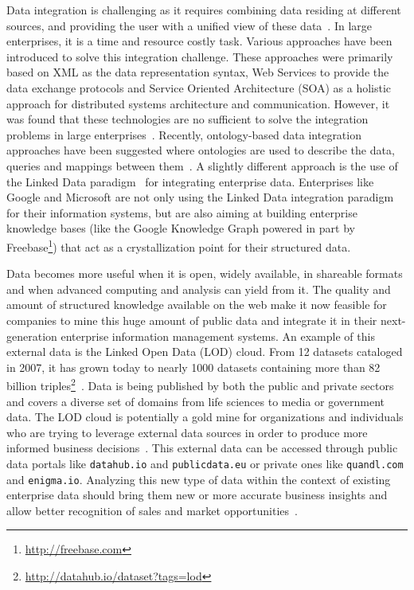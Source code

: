 Data integration is challenging as it requires combining data residing at different sources, and providing the user with a unified view of these data~\cite{Lenzerini:SIGMOD:02}. In large enterprises, it is a time and resource costly task. Various approaches have been introduced to solve this integration challenge. These approaches were primarily based on XML as the data representation syntax, Web Services to provide the data exchange protocols and Service Oriented Architecture (SOA) as a holistic approach for distributed systems architecture and communication. However, it was found that these technologies are no sufficient to solve the integration problems in large enterprises~\cite{Frischmuth:ISWC:13,Frischmuth:SemWebJorunal:12}. Recently, ontology-based data integration approaches have been suggested where ontologies are used to describe the data, queries and mappings between them~\cite{Wache:IJCAI:01}. A slightly different approach is the use of the Linked Data paradigm~\cite{Bizer:IJSWIS:09} for integrating enterprise data. Enterprises like Google and Microsoft are not only using the Linked Data integration paradigm for their information systems, but are also aiming at building enterprise knowledge bases (like the Google Knowledge Graph powered in part by Freebase\footnote{\url{http://freebase.com}}) that act as a crystallization point for their structured data.

Data becomes more useful when it is open, widely available, in shareable formats and when advanced computing and analysis can yield from it. The quality and amount of structured knowledge available on the web make it now feasible for companies to mine this huge amount of public data and integrate it in their next-generation enterprise information management systems. An example of this external data is the Linked Open Data (LOD) cloud. From 12 datasets cataloged in 2007, it has grown today to nearly 1000 datasets containing more than 82 billion triples\footnote{\url{http://datahub.io/dataset?tags=lod}}~\cite{Bizer:IJSWIS:09}. Data is being published by both the public and private sectors and covers a diverse set of domains from life sciences to media or government data. The LOD cloud is potentially a gold mine for organizations and individuals who are trying to leverage external data sources in order to produce more informed business decisions~\cite{Boyd:Article:11}. This external data can be accessed through public data portals like \texttt{datahub.io} and \texttt{publicdata.eu} or private ones like \texttt{quandl.com} and \texttt{enigma.io}. Analyzing this new type of data within the context of existing enterprise data should bring them new or more accurate business insights and allow better recognition of sales and market opportunities~\cite{LaValle:MIT:11}.

